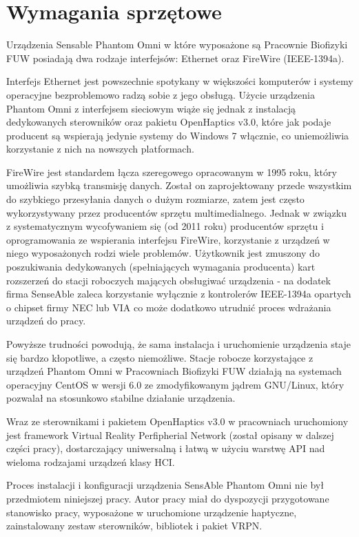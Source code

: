 \documentclass[licencjacka]{pracamgr}
\begin{document}
\section{Wymagania sprzętowe}

	Urządzenia Sensable Phantom Omni w które wyposażone są Pracownie Biofizyki FUW posiadają dwa rodzaje interfejsów: Ethernet oraz FireWire (IEEE-1394a). 

Interfejs Ethernet jest powszechnie spotykany w większości komputerów i systemy operacyjne bezproblemowo radzą sobie z jego obsługą. Użycie urządzenia Phantom Omni z interfejsem sieciowym wiąże się jednak z instalacją dedykowanych sterowników oraz pakietu OpenHaptics v3.0, które jak podaje producent są wspierają jedynie systemy do Windows 7 włącznie, co uniemożliwia korzystanie z nich na nowszych platformach.

FireWire jest standardem łącza szeregowego opracowanym w 1995 roku, który umożliwia szybką transmisję danych. Został on zaprojektowany przede wszystkim do szybkiego przesyłania danych o dużym rozmiarze, zatem jest często wykorzystywany przez producentów sprzętu multimedialnego. Jednak w związku z systematycznym wycofywaniem się (od 2011 roku) producentów sprzętu i oprogramowania ze wspierania interfejsu FireWire, korzystanie z urządzeń w niego wyposażonych rodzi wiele problemów. Użytkownik jest zmuszony do poszukiwania dedykowanych (spełniających wymagania producenta) kart rozszerzeń do stacji roboczych mających obsługiwać urządzenia - na dodatek firma SenseAble zaleca korzystanie wyłącznie z kontrolerów IEEE-1394a opartych o chipset firmy NEC lub VIA co może dodatkowo utrudnić proces wdrażania urządzeń do pracy.

Powyższe trudności powodują, że sama instalacja i uruchomienie urządzenia staje się bardzo kłopotliwe, a często niemożliwe. Stacje robocze korzystające z urządzeń Phantom Omni w Pracowniach Biofizyki FUW działają na systemach operacyjny CentOS w wersji 6.0 ze zmodyfikowanym jądrem GNU/Linux, który pozwalał na stosunkowo stabilne działanie urządzenia. 

Wraz ze sterownikami i pakietem OpenHaptics v3.0 w pracowniach uruchomiony jest framework Virtual Reality Perfipherial Network (został opisany w dalszej części pracy), dostarczający uniwersalną i łatwą w użyciu warstwę API nad wieloma rodzajami urządzeń klasy HCI. 

Proces instalacji i konfiguracji urządzenia SensAble Phantom Omni nie był przedmiotem niniejszej pracy. Autor pracy miał do dyspozycji przygotowane stanowisko pracy, wyposażone w uruchomione urządzenie haptyczne, zainstalowany zestaw sterowników, bibliotek i pakiet VRPN.
\end{document}
